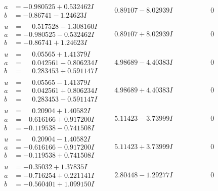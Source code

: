 \documentclass[1p]{elsarticle_modified}
\theoremstyle{definition}
\begin{document}
$$\begin{array}{c|c|c}
\begin{aligned}
a &= -0.980525 + 0.532462 I \\
b &= -0.86741 - 1.24623 I\end{aligned}
 & \phantom{-}0.89107 - 8.02939 I & \phantom{-0.000000 } 0 \\ \hline\begin{aligned}
u &= \phantom{-}0.517528 - 1.308160 I \\
a &= -0.980525 - 0.532462 I \\
b &= -0.86741 + 1.24623 I\end{aligned}
 & \phantom{-}0.89107 + 8.02939 I & \phantom{-0.000000 } 0 \\ \hline\begin{aligned}
u &= \phantom{-}0.05565 + 1.41379 I \\
a &= \phantom{-}0.042561 - 0.806234 I \\
b &= \phantom{-}0.283453 + 0.591147 I\end{aligned}
 & \phantom{-}4.98689 - 4.40383 I & \phantom{-0.000000 } 0 \\ \hline\begin{aligned}
u &= \phantom{-}0.05565 - 1.41379 I \\
a &= \phantom{-}0.042561 + 0.806234 I \\
b &= \phantom{-}0.283453 - 0.591147 I\end{aligned}
 & \phantom{-}4.98689 + 4.40383 I & \phantom{-0.000000 } 0 \\ \hline\begin{aligned}
u &= \phantom{-}0.20904 + 1.40582 I \\
a &= -0.616166 + 0.917200 I \\
b &= -0.119538 - 0.741508 I\end{aligned}
 & \phantom{-}5.11423 - 3.73999 I & \phantom{-0.000000 } 0 \\ \hline\begin{aligned}
u &= \phantom{-}0.20904 - 1.40582 I \\
a &= -0.616166 - 0.917200 I \\
b &= -0.119538 + 0.741508 I\end{aligned}
 & \phantom{-}5.11423 + 3.73999 I & \phantom{-0.000000 } 0 \\ \hline\begin{aligned}
u &= -0.35032 + 1.37835 I \\
a &= -0.716254 + 0.221141 I \\
b &= -0.560401 + 1.099150 I\end{aligned}
 & \phantom{-}2.80448 - 1.29277 I & \phantom{-0.000000 } 0 \\ \hline\begin{aligned}

\end{aligned}
\end{array}$$
\end{document}
